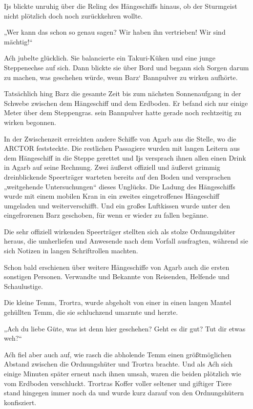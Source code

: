 Ijs blickte unruhig über die Reling des Hängeschiffs hinaus, ob der Sturmgeist nicht plötzlich doch noch zurückkehren wollte.

„Wer kann das schon so genau sagen? Wir haben ihn vertrieben! Wir sind mächtig!“

Aćh jubelte glücklich. Sie balancierte ein Takuri-Küken und eine junge Steppenechse auf sich. Dann blickte sie über Bord und begann sich Sorgen darum zu machen, was geschehen würde, wenn Barz‘ Bannpulver zu wirken aufhörte.



\trennzeichen



Tatsächlich hing Barz die gesamte Zeit bis zum nächsten Sonnenaufgang in der Schwebe zwischen dem Hängeschiff und dem Erdboden. Er befand sich nur einige Meter über dem Steppengras. sein Bannpulver hatte gerade noch rechtzeitig zu wirken begonnen.

In der Zwischenzeit erreichten andere Schiffe von Agarb aus die Stelle, wo die ARCTOR feststeckte. Die restlichen Passagiere wurden mit langen Leitern aus dem Hängeschiff in die Steppe gerettet und Ijs versprach ihnen allen einen Drink in Agarb auf seine Rechnung. Zwei äußerst offiziell und äußerst grimmig dreinblickende Speerträger warteten bereits auf den Boden und versprachen „weitgehende Untersuchungen“ dieses Unglücks. Die Ladung des Hängeschiffs wurde mit einem mobilen Kran in ein zweites eingetroffenes Hängeschiff umgeladen und weiterverschifft. Und ein großes Luftkissen wurde unter den eingefrorenen Barz geschoben, für wenn er wieder zu fallen begänne.

Die sehr offiziell wirkenden Speerträger stellten sich als stolze Ordnungshüter heraus, die umherliefen und Anwesende nach dem Vorfall ausfragten, während sie sich Notizen in langen Schriftrollen machten.

Schon bald erschienen über weitere Hängeschiffe von Agarb auch die ersten sonstigen Personen. Verwandte und Bekannte von Reisenden, Helfende und Schaulustige.

Die kleine Temm, Trortra, wurde abgeholt von einer in einen langen Mantel gehüllten Temm, die sie schluchzend umarmte und herzte.

„Ach du liebe Güte, was ist denn hier geschehen? Geht es dir gut? Tut dir etwas weh?“

Aćh fiel aber auch auf, wie rasch die abholende Temm einen größtmöglichen Abstand zwischen die Ordnungshüter und Trortra brachte. Und als Aćh sich einige Minuten später erneut nach ihnen umsah, waren die beiden plötzlich wie vom Erdboden verschluckt. Trortras Koffer voller seltener und giftiger Tiere stand hingegen immer noch da und wurde kurz darauf von den Ordnungshütern konfisziert.

